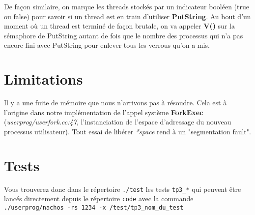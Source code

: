 \documentclass[12pt,a4paper]{article}
\begin{document}
De façon similaire, on marque les threads stockés par un indicateur booléen (true ou false) pour savoir si un thread est en train d'utiliser \textbf{PutString}. Au bout d'un moment où un thread est terminé de façon brutale, on va appeler \textbf{V()} sur la sémaphore de PutString autant de fois que le nombre des processus qui n'a pas encore fini avec PutString pour enlever tous les verrous qu'on a mis.

\section{Limitations}
Il y a une fuite de mémoire que nous n'arrivons pas à résoudre. Cela est à l'origine dans notre implémentation de l'appel système \textbf{ForkExec} (\textit{userprog/userfork.cc:47}, l'instanciation de l'espace d'adressage du nouveau processus utilisateur). Tout essai de libérer \textit{*space} rend à un "segmentation fault".

\section{Tests}
Vous trouverez donc dans le répertoire \verb$./test$ les tests \verb$tp3_*$ qui peuvent être lancés directement depuis le répertoire \verb$code$ avec la commande \texttt{./userprog/nachos -rs 1234 -x /test/tp3\_nom\_du\_test}
\end{document}
